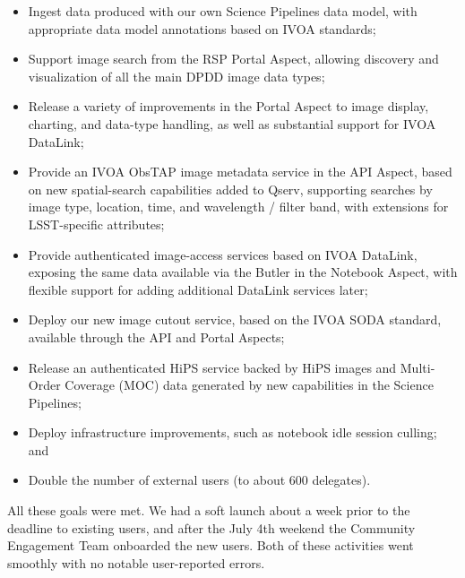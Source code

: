 \begin{itemize}
    \item Ingest data produced with our own Science Pipelines data model, with appropriate data model annotations based on IVOA standards;
    \item Support image search from the RSP Portal Aspect, allowing discovery and visualization of all the main DPDD image data types;
    \item Release a variety of improvements in the Portal Aspect to image display, charting, and data-type handling, as well as substantial support for IVOA DataLink;
    \item Provide an IVOA ObsTAP image metadata service in the API Aspect, based on new spatial-search capabilities added to Qserv, supporting searches by image type, location, time, and wavelength / filter band, with extensions for LSST-specific attributes;
    \item Provide authenticated image-access services based on IVOA DataLink, exposing the same data available via the Butler in the Notebook Aspect, with flexible support for adding additional DataLink services later;
    \item Deploy our new image cutout service, based on the IVOA SODA standard, available through the API and Portal Aspects;
    \item Release an authenticated HiPS service backed by HiPS images and Multi-Order Coverage (MOC) data generated by new capabilities in the Science Pipelines;
    \item Deploy infrastructure improvements, such as notebook idle session culling; and
    \item Double the number of external users (to about 600 delegates).
\end{itemize}

All these goals were met.
We had a soft launch about a week prior to the deadline to existing users, and after the July 4th weekend the Community Engagement Team onboarded the new users. Both of these activities went smoothly with no notable user-reported errors.



